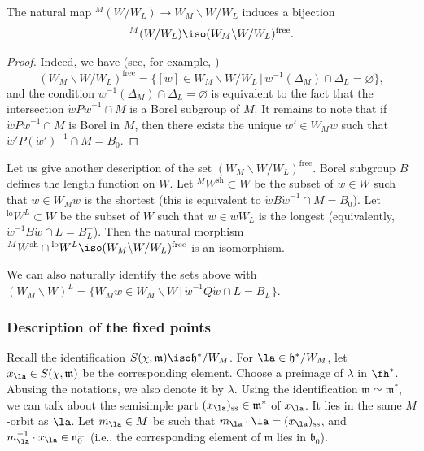\documentclass[12pt]{amsart}
\begin{document}
\begin{lemma}
The natural map ${}^M(W/W_{L}) \to W_M\backslash W/W_{L}$ induces a bijection 
 $$
 {}^M(W/W_{L})\iso (W_M\backslash W/W_{L})^{\mathrm{free}}.
 $$
\end{lemma} 
\begin{proof}
 Indeed, we have (see, for example, \cite[Appendix B]{losev_krylov_wc_for_gieseker})
 \begin{equation*}
 (W_M\backslash W/W_{L})^{\mathrm{free}}=\{[w] \in W_M\backslash W/W_{L}\,|\, w^{-1}(\Delta_M) \cap \Delta_{L} = \varnothing\},
 \end{equation*}
 and the condition $w^{-1}(\Delta_M) \cap \Delta_{L} = \varnothing$ is equivalent to the fact that the intersection $\dot{w}P \dot{w}^{-1} \cap M$ is a Borel subgroup of $M$. It remains to note that if $\dot{w}P \dot{w}^{-1} \cap M$ is Borel in $M$, then there exists the unique $w' \in W_Mw$ such that ${\dot{w}'}P({\dot{w}'})^{-1} \cap M = B_0$.
\end{proof}





Let us give another description of the set $(W_M\backslash W/W_{L})^{\mathrm{free}}$.  Borel subgroup $B$ defines the length function on $W$. Let ${}^MW^{\mathrm{sh}} \subset W$ be the subset of $w \in W$ such that $w \in W_Mw$ is the shortest (this is equivalent to $\dot{w}B\dot{w}^{-1} \cap M=B_0$). Let ${}^{\mathrm{lo}}W^{L} \subset W$ be the subset of $W$ such that $w \in wW_L$ is the longest  (equivalently, $\dot{w}^{-1}B\dot{w} \cap L = B_{L}^{-}$). Then the natural morphism ${}^MW^{\mathrm{sh}} \cap {}^{\mathrm{lo}}W^{L} \iso (W_M\backslash W/W_{L})^{\mathrm{free}}$ is an isomorphism.

\begin{rmk}
We can also naturally identify the sets above with $(W_M\backslash W)^L=\{W_Mw \in W_M \backslash W\,|\, \dot{w}^{-1}Q\dot{w} \cap L=B_L^{-}\}$.
\end{rmk}
 

\subsubsection{Description of the fixed points} Recall the identification $S(\chi,\mathfrak{m}) \iso \mathfrak{h}^*/W_M$.
For $\la \in \mathfrak{h}^*/W_M$, let $x_\la \in S(\chi,\mathfrak{m})$ be the corresponding element. Choose a preimage of $\lambda$ in $\fh^*$. Abusing the notations, we also denote it by $\lambda$. Using the identification $\mathfrak{m} \simeq \mathfrak{m}^*$, we can talk about the semisimple part $(x_\la)_{\mathrm{ss}} \in \mathfrak{m}^*$ of $x_\la$. It lies in the same $M$-orbit as $\la$. Let $m_\la \in M$ be such that $m_\la \cdot \la =(x_\la)_{\mathrm{ss}}$, and $m_\la^{-1} \cdot x_\la \in \mathfrak{n}_0^{\perp}$ (i.e., the corresponding element of $\mathfrak{m}$ lies in $\mathfrak{b}_0$). 
\end{document}
